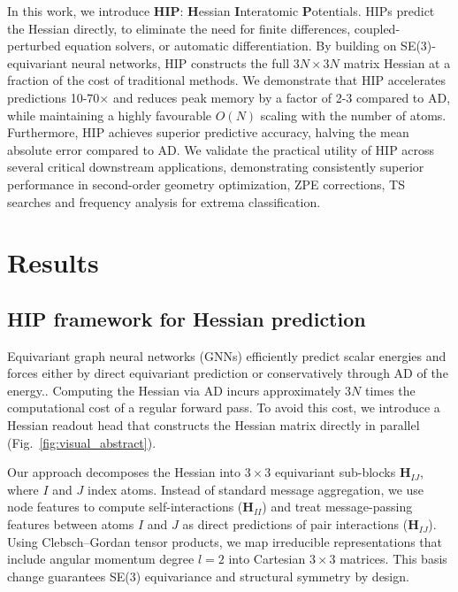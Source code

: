 \documentclass[pdflatex,sn-mathphys-num]{sn-jnl}%
\begin{document}
In this work, we introduce \textbf{HIP}: \textbf{H}essian \textbf{I}nteratomic \textbf{P}otentials. HIPs predict the Hessian directly, to eliminate the need for finite differences, coupled-perturbed equation solvers, or automatic differentiation. By building on SE(3)-equivariant neural networks, HIP constructs the full $3N \times 3N$ matrix Hessian at a fraction of the cost of traditional methods. We demonstrate that HIP accelerates predictions 10-70$\times$ and reduces peak memory by a factor of 2-3 compared to AD, while maintaining a highly favourable $O(N)$ scaling with the number of atoms. Furthermore, HIP achieves superior predictive accuracy, halving the mean absolute error compared to AD. We validate the practical utility of HIP across several critical downstream applications, demonstrating consistently superior performance in second-order geometry optimization, ZPE corrections, TS searches and frequency analysis for extrema classification.


\section{Results}


\subsection{HIP framework for Hessian prediction}

Equivariant graph neural networks (GNNs) efficiently predict scalar energies and forces either by direct equivariant prediction or conservatively through AD of the energy.\cite{schutt2018,duvalHitchhikerGuideGeometric2024a,duvenaud2015convolutional,bigiDarkSideForces2025}. Computing the Hessian via AD incurs approximately $3N$ times the computational cost of a regular forward pass. To avoid this cost, we introduce a Hessian readout head that constructs the Hessian matrix directly in parallel (Fig.~\ref{fig:visual_abstract}).

Our approach decomposes the Hessian into $3 \times 3$ equivariant sub-blocks $\mathbf{H}_{IJ}$, where $I$ and $J$ index atoms. Instead of standard message aggregation, we use node features to compute self-interactions ($\mathbf{H}_{II}$) and treat message-passing features between atoms $I$ and $J$ as direct predictions of pair interactions ($\mathbf{H}_{IJ}$). Using Clebsch--Gordan tensor products, we map irreducible representations that include angular momentum degree $l=2$ into Cartesian $3 \times 3$ matrices. This basis change guarantees SE(3) equivariance and structural symmetry by design.
\end{document}
